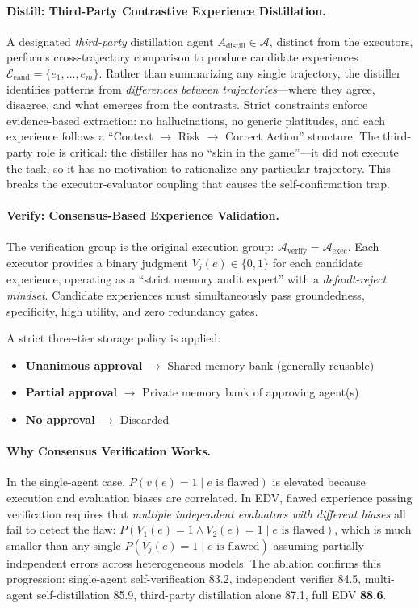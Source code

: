 \documentclass[11pt,a4paper]{article}
\begin{document}
\paragraph{Distill: Third-Party Contrastive Experience Distillation.}
A designated \emph{third-party} distillation agent $A_{\mathrm{distill}} \in \mathcal{A}$, distinct from the executors, performs cross-trajectory comparison to produce candidate experiences $\mathcal{E}_{\mathrm{cand}} = \{e_1, \ldots, e_m\}$. Rather than summarizing any single trajectory, the distiller identifies patterns from \emph{differences between trajectories}---where they agree, disagree, and what emerges from the contrasts. Strict constraints enforce evidence-based extraction: no hallucinations, no generic platitudes, and each experience follows a ``Context $\to$ Risk $\to$ Correct Action'' structure. The third-party role is critical: the distiller has no ``skin in the game''---it did not execute the task, so it has no motivation to rationalize any particular trajectory. This breaks the executor-evaluator coupling that causes the self-confirmation trap.

\paragraph{Verify: Consensus-Based Experience Validation.}
The verification group is the original execution group: $\mathcal{A}_{\mathrm{verify}} = \mathcal{A}_{\mathrm{exec}}$. Each executor provides a binary judgment $V_j(e) \in \{0,1\}$ for each candidate experience, operating as a ``strict memory audit expert'' with a \emph{default-reject mindset}. Candidate experiences must simultaneously pass groundedness, specificity, high utility, and zero redundancy gates.

A strict three-tier storage policy is applied:
\begin{itemize}
\item \textbf{Unanimous approval} $\to$ Shared memory bank (generally reusable)
\item \textbf{Partial approval} $\to$ Private memory bank of approving agent(s)
\item \textbf{No approval} $\to$ Discarded
\end{itemize}

\paragraph{Why Consensus Verification Works.} In the single-agent case, $P(v(e)=1 \mid e \text{ is flawed})$ is elevated because execution and evaluation biases are correlated. In EDV, flawed experience passing verification requires that \emph{multiple independent evaluators with different biases} all fail to detect the flaw: $P(V_1(e)=1 \land V_2(e)=1 \mid e \text{ is flawed})$, which is much smaller than any single $P(V_j(e)=1 \mid e \text{ is flawed})$ assuming partially independent errors across heterogeneous models. The ablation confirms this progression: single-agent self-verification 83.2, independent verifier 84.5, multi-agent self-distillation 85.9, third-party distillation alone 87.1, full EDV \textbf{88.6}.
\end{document}
